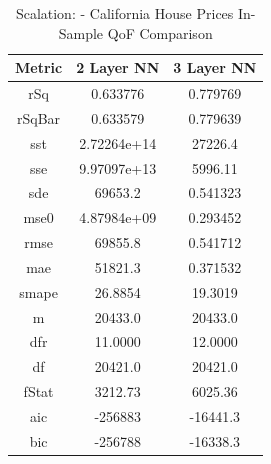 \documentclass{article}
\begin{document}
\begin{table}[H]
\centering
\caption{Scalation: - California House Prices In-Sample QoF Comparison}
\label{tab:Scalation: - California House Prices In-Sample QoF Comparison}
\begin{tabular}{|c|c|c|} \hline 
Metric & 2 Layer NN & 3 Layer NN \\ \hline \hline 
rSq & 0.633776 & 0.779769 \\ \hline 
rSqBar & 0.633579 & 0.779639 \\ \hline 
sst & 2.72264e+14 & 27226.4 \\ \hline 
sse & 9.97097e+13 & 5996.11 \\ \hline 
sde & 69653.2 & 0.541323 \\ \hline 
mse0 & 4.87984e+09 & 0.293452 \\ \hline 
rmse & 69855.8 & 0.541712 \\ \hline 
mae & 51821.3 & 0.371532 \\ \hline 
smape & 26.8854 & 19.3019 \\ \hline 
m & 20433.0 & 20433.0 \\ \hline 
dfr & 11.0000 & 12.0000 \\ \hline 
df & 20421.0 & 20421.0 \\ \hline 
fStat & 3212.73 & 6025.36 \\ \hline 
aic & -256883 & -16441.3 \\ \hline 
bic & -256788 & -16338.3 \\ \hline 
\end{tabular}
\end{table}
\end{document}
